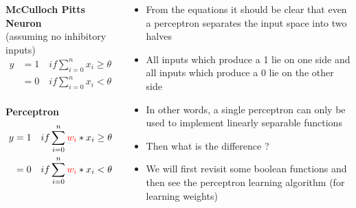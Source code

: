 \documentclass[serif, aspectratio=169]{beamer}
\begin{document}
\begin{frame}
\begin{columns}

\begin{overlayarea}{\textwidth}{\textheight}

\textbf{McCulloch Pitts Neuron}\\
(assuming no inhibitory inputs)
\begin{align*}
y &=1 \quad if \sum^{n}_{i=0} x_i \geq \theta \\
&=0  \quad if \sum^{n}_{i=0} x_i < \theta \\
\end{align*}

\textbf{Perceptron}
\begin{align*}
y &=1 \quad if \sum^{n}_{i=0} \color{red}{w_i} \color{black}{} * x_i \geq \theta \\
&=0  \quad if \sum^{n}_{i=0} \color{red}{w_i} \color{black}{} * x_i < \theta\\
\end{align*}


\end{overlayarea}

\begin{overlayarea}{\textwidth}{\textheight}
\begin{itemize}\justifying
\item<2-> From the equations it should be clear that even a perceptron separates the input space into two halves
\item<3-> All inputs which produce a 1 lie on one side and all inputs which produce a 0 lie on the other side
\item<4-> In other words, a single perceptron can only be used to implement linearly separable functions
\item<5-> Then what is the difference ? 
\item<7-> We will first revisit some boolean functions and then see the perceptron learning algorithm (for learning weights) 
\end{itemize}
\end{overlayarea}
\end{columns}
\end{frame}
\end{document}
